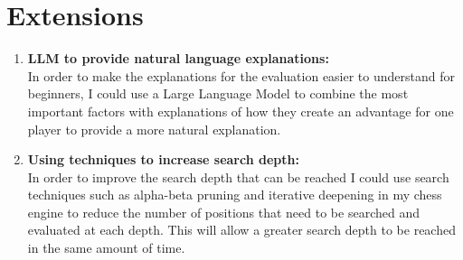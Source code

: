 \documentclass[12pt,a4paper]{article}
\begin{document}
\section*{Extensions}
\begin{enumerate}
    \item \textbf{LLM to provide natural language explanations:}
    \\In order to make the explanations for the evaluation easier to understand for beginners, I could use a Large Language Model to combine the most important factors with explanations of how they create an advantage for one player to provide a more natural explanation.
    \item \textbf{Using techniques to increase search depth:}
    \\In order to improve the search depth that can be reached I could use search techniques such as alpha-beta pruning and iterative deepening in my chess engine to reduce the number of positions that need to be searched and evaluated at each depth. This will allow a greater search depth to be reached in the same amount of time.
\end{enumerate}
\end{document}
